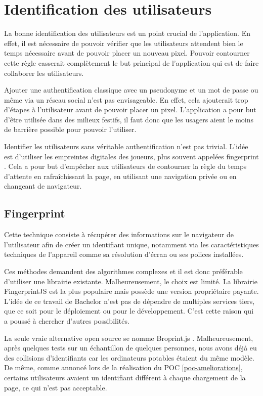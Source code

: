 \section{Identification des utilisateurs}
La bonne identification des utilisateurs est un point crucial de l'application. En effet, il est nécessaire de pouvoir vérifier que les utilisateurs attendent bien le temps nécessaire avant de pouvoir placer un nouveau pixel. Pouvoir contourner cette règle casserait complètement le but principal de l'application qui est de faire collaborer les utilisateurs.

Ajouter une authentification classique avec un pseudonyme et un mot de passe ou même via un réseau social n'est pas envisageable. En effet, cela ajouterait trop d'étapes à l'utilisateur avant de pouvoir placer un pixel. L'application a pour but d'être utilisée dans des milieux festifs, il faut donc que les usagers aient le moins de barrière possible pour pouvoir l'utiliser.

Identifier les utilisateurs sans véritable authentification n'est pas trivial. L'idée est d'utiliser les empreintes digitales des joueurs, plus souvent appelées fingerprint \cite{devicefingerprint}. Cela a pour but d'empêcher aux utilisateurs de contourner la règle du temps d'attente en rafraîchissant la page, en utilisant une navigation privée ou en changeant de navigateur.

\subsection{Fingerprint}

Cette technique consiste à récupérer des informations sur le navigateur de l'utilisateur afin de créer un identifiant unique, notamment via les caractéristiques techniques de l'appareil comme sa résolution d'écran ou ses polices installées.

Ces méthodes demandent des algorithmes complexes et il est donc préférable d'utiliser une librairie existante. Malheureusement, le choix est limité. La librairie FingerprintJS \cite{fingerprintjs} est la plus populaire mais possède une version propriétaire payante. L'idée de ce travail de Bachelor n'est pas de dépendre de multiples services tiers, que ce soit pour le déploiement ou pour le développement. C'est cette raison qui a poussé à chercher d'autres possibilités.

La seule vraie alternative open source se nomme Broprint.js \cite{broprintjs}. Malheureusement, après quelques tests sur un échantillon de quelques personnes, nous avons déjà eu des collisions d'identifiants car les ordinateurs potables étaient du même modèle. De même, comme annoncé lors de la réalisation du POC \ref{poc-ameliorations}, certains utilisateurs avaient un identifiant différent à chaque chargement de la page, ce qui n'est pas acceptable.

